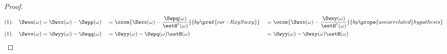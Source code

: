 \begin{proof}
\begin{align*}
     (1).\quad \Swuu(\omega) &= \Swxx(\omega) - \Swpp(\omega) &&=\ocom{\Swxx(\omega) - \frac{\Swpq(\omega)}{\estH^\ast( \omega)}}{by \pref{cor:RxySwxy}} &&= \ocom{\Swxx(\omega) - \frac{\Swxy(\omega)}{\estH^\ast( \omega)}}{by \prope{uncorrelated} hypothesis}
   \\(1).\quad \Swvv(\omega) &= \Swyy(\omega) - \Swqq(\omega) &&= \Swyy(\omega) - \Swpq(\omega)\estH     ( \omega) &&= \Swyy(\omega) - \Swxy(\omega)\estH     ( \omega)

\end{align*}
\end{proof}

